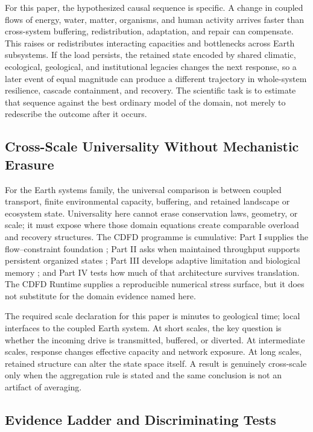 \documentclass[12pt,a4paper]{article}
\begin{document}
For this paper, the hypothesized causal sequence is specific. A change in
coupled flows of energy, water, matter, organisms, and human activity arrives faster than cross-system buffering, redistribution, adaptation, and repair can compensate.
This raises or redistributes interacting capacities and bottlenecks across Earth subsystems. If the load persists,
the retained state encoded by shared climatic, ecological, geological, and institutional legacies changes the next response, so a later event of equal
magnitude can produce a different trajectory in whole-system resilience, cascade containment, and recovery. The
scientific task is to estimate that sequence against the best ordinary model of
the domain, not merely to redescribe the outcome after it occurs.

\subsection{Cross-Scale Universality Without Mechanistic Erasure}

For the Earth systems family, the universal comparison is between coupled transport, finite environmental capacity, buffering, and retained landscape or ecosystem state. Universality here cannot erase conservation laws, geometry, or scale; it must expose where those domain equations create comparable overload and recovery structures. \cite{Holling1973,Turing1952,BakTangWiesenfeld1987}
The CDFD programme is cumulative: Part I supplies the flow--constraint
foundation \cite{MujjabiPartI2026}; Part II asks when maintained throughput
supports persistent organized states \cite{MujjabiPartII2026}; Part III
develops adaptive limitation and biological memory \cite{MujjabiPartIII2026};
and Part IV \cite{MujjabiPartIV2026} tests how much of that architecture
survives translation. The CDFD Runtime \cite{CDFDRuntime2026} supplies a
reproducible numerical stress surface, but it does not substitute for the
domain evidence named here.

The required scale declaration for this paper is minutes to geological time; local interfaces to the coupled Earth system. At short
scales, the key question is whether the incoming drive is transmitted,
buffered, or diverted. At intermediate scales, response changes effective
capacity and network exposure. At long scales, retained structure can alter the
state space itself. A result is genuinely cross-scale only when the aggregation
rule is stated and the same conclusion is not an artifact of averaging.

\subsection{Evidence Ladder and Discriminating Tests}
\end{document}
